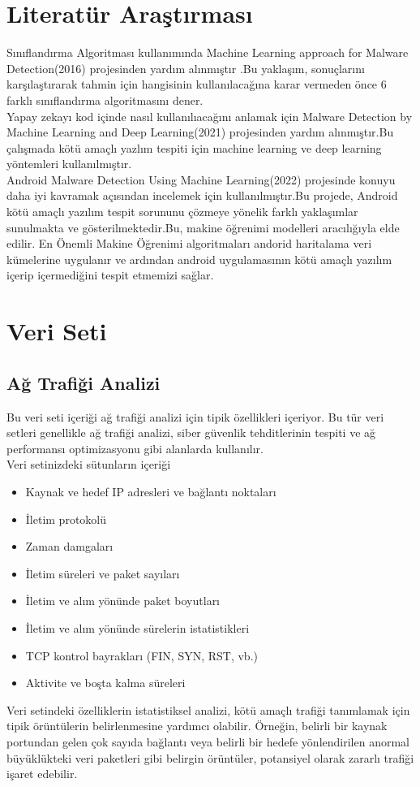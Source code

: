 \documentclass{article}
\begin{document}
\section{Literatür Araştırması}
Sınıflandırma Algoritması kullanımında Machine Learning approach for Malware Detection(2016) projesinden yardım alınmıştır .\cite{git1}Bu yaklaşım, sonuçlarını karşılaştırarak tahmin için hangisinin kullanılacağına karar vermeden önce 6 farklı sınıflandırma algoritmasını dener.
\\
Yapay zekayı kod içinde nasıl kullanılıacağını anlamak için Malware Detection by Machine Learning and Deep Learning(2021) projesinden yardım  alınmıştır.\cite{ytp1}Bu çalışmada kötü amaçlı yazlım tespiti için machine learning ve deep learning yöntemleri kullanılmıştır.
 \\
 Android Malware Detection Using Machine Learning(2022) projesinde konuyu daha iyi kavramak açısından incelemek için kullanılmıştır.\cite{git2}Bu projede, Android kötü amaçlı yazılım tespit sorununu çözmeye yönelik farklı yaklaşımlar sunulmakta ve gösterilmektedir.Bu, makine öğrenimi modelleri aracılığıyla elde edilir. En Önemli Makine Öğrenimi algoritmaları andorid haritalama veri kümelerine uygulanır ve ardından android uygulamasının kötü amaçlı yazılım içerip içermediğini tespit etmemizi sağlar.

 \section{Veri Seti}
\subsection{Ağ Trafiği Analizi}
Bu veri seti  içeriği ağ trafiği analizi için tipik özellikleri içeriyor. Bu tür veri setleri genellikle ağ trafiği analizi, siber güvenlik tehditlerinin tespiti ve ağ performansı optimizasyonu gibi alanlarda kullanılır.\\
Veri setinizdeki sütunların içeriği
\begin{itemize}
    \item Kaynak ve hedef IP adresleri ve bağlantı noktaları
    \item İletim protokolü
    \item Zaman damgaları
    \item İletim süreleri ve paket sayıları
    \item İletim ve alım yönünde paket boyutları
    \item İletim ve alım yönünde sürelerin istatistikleri
    \item TCP kontrol bayrakları (FIN, SYN, RST, vb.)
    \item Aktivite ve boşta kalma süreleri
\end{itemize}
Veri setindeki özelliklerin istatistiksel analizi, kötü amaçlı trafiği tanımlamak için tipik örüntülerin belirlenmesine yardımcı olabilir. Örneğin, belirli bir kaynak portundan gelen çok sayıda bağlantı veya belirli bir hedefe yönlendirilen anormal büyüklükteki veri paketleri gibi belirgin örüntüler, potansiyel olarak zararlı trafiği işaret edebilir.\cite{1}
\end{document}
